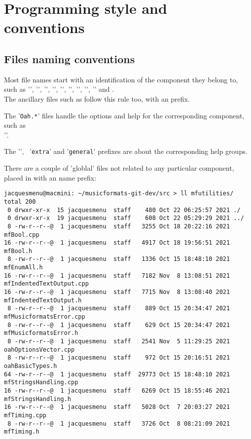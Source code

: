 
\chapter{Programming style and conventions}


\section{Files naming conventions}

Most file names start with an identification of the component they belong to, such as '', '', '', '', '', '', '', '', '' and .\\
The ancillary files such as  follow this rule too, with an  prefix.

The '{\tt *Oah.*}' files handle the options and help for the corresponding component, such as\\ ''.

The '', \, '{\tt extra}' and '{\tt general}' prefixes are about the corresponding help groups.

There are a couple of 'globlal' files not related to any particular component, placed in \mfutilities{} with an  name prefix:
\begin{lstlisting}[language=Terminal]
jacquesmenu@macmini: ~/musicformats-git-dev/src > ll mfutilities/
total 200
 0 drwxr-xr-x  15 jacquesmenu  staff    480 Oct 22 06:25:57 2021 ./
 0 drwxr-xr-x  19 jacquesmenu  staff    608 Oct 22 05:29:29 2021 ../
 8 -rw-r--r--@  1 jacquesmenu  staff   3255 Oct 18 20:22:16 2021 mfBool.cpp
16 -rw-r--r--@  1 jacquesmenu  staff   4917 Oct 18 19:56:51 2021 mfBool.h
 8 -rw-r--r--@  1 jacquesmenu  staff   1336 Oct 15 18:48:10 2021 mfEnumAll.h
16 -rw-r--r--@  1 jacquesmenu  staff   7182 Nov  8 13:08:51 2021 mfIndentedTextOutput.cpp
16 -rw-r--r--@  1 jacquesmenu  staff   7715 Nov  8 13:08:40 2021 mfIndentedTextOutput.h
 8 -rw-r--r--@  1 jacquesmenu  staff    889 Oct 15 20:34:47 2021 mfMusicformatsError.cpp
 8 -rw-r--r--@  1 jacquesmenu  staff    629 Oct 15 20:34:47 2021 mfMusicformatsError.h
 8 -rw-r--r--@  1 jacquesmenu  staff   2541 Nov  5 11:29:25 2021 oahOptionsVector.cpp
 8 -rw-r--r--@  1 jacquesmenu  staff    972 Oct 15 20:16:51 2021 oahBasicTypes.h
64 -rw-r--r--@  1 jacquesmenu  staff  29773 Oct 15 18:48:10 2021 mfStringsHandling.cpp
16 -rw-r--r--@  1 jacquesmenu  staff   6269 Oct 15 18:55:46 2021 mfStringsHandling.h
16 -rw-r--r--@  1 jacquesmenu  staff   5028 Oct  7 20:03:27 2021 mfTiming.cpp
 8 -rw-r--r--@  1 jacquesmenu  staff   3726 Oct  8 08:21:09 2021 mfTiming.h
\end{lstlisting}

